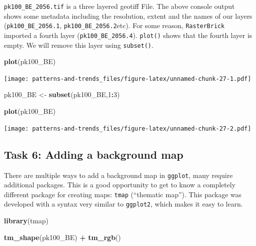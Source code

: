 \documentclass[]{book}
\newenvironment{Shaded}{\begin{snugshade}}{\end{snugshade}}
\newcommand{\DecValTok}[1]{\textcolor[rgb]{0.00,0.00,0.81}{#1}}
\newcommand{\KeywordTok}[1]{\textcolor[rgb]{0.13,0.29,0.53}{\textbf{#1}}}
\newcommand{\NormalTok}[1]{#1}
\newcommand{\OperatorTok}[1]{\textcolor[rgb]{0.81,0.36,0.00}{\textbf{#1}}}
\newcommand{\StringTok}[1]{\textcolor[rgb]{0.31,0.60,0.02}{#1}}
\begin{document}
\texttt{pk100\_BE\_2056.tif} is a three layered geotiff File. The above console output shows some metadata including the resolution, extent and the names of our layers (\texttt{pk100\_BE\_2056.1}, \texttt{pk100\_BE\_2056.2}etc). For some reason, \texttt{RasterBrick} imported a fourth layer (\texttt{pk100\_BE\_2056.4}). \texttt{plot()} shows that the fourth layer is empty. We will remove this layer using \texttt{subset()}.

\begin{Shaded}
\begin{Highlighting}[]

\KeywordTok{plot}\NormalTok{(pk100_BE)}
\end{Highlighting}
\end{Shaded}

\texttt{[image: patterns-and-trends\_files/figure-latex/unnamed-chunk-27-1.pdf]}

\begin{Shaded}
\begin{Highlighting}[]

\NormalTok{pk100_BE <-}\StringTok{ }\KeywordTok{subset}\NormalTok{(pk100_BE,}\DecValTok{1}\OperatorTok{:}\DecValTok{3}\NormalTok{)}

\KeywordTok{plot}\NormalTok{(pk100_BE)}
\end{Highlighting}
\end{Shaded}

\texttt{[image: patterns-and-trends\_files/figure-latex/unnamed-chunk-27-2.pdf]}

\hypertarget{task-6-adding-a-background-map}{%
\subsection{Task 6: Adding a background map}\label{task-6-adding-a-background-map}}

There are multiple ways to add a background map in \texttt{ggplot}, many require additional packages. This is a good opportunity to get to know a completely different package for creating maps: \texttt{tmap} (``thematic map''). This package was developed with a syntax very similar to \texttt{ggplot2}, which makes it easy to learn.

\begin{Shaded}
\begin{Highlighting}[]
\KeywordTok{library}\NormalTok{(tmap)}


\KeywordTok{tm_shape}\NormalTok{(pk100_BE) }\OperatorTok{+}\StringTok{ }
\StringTok{  }\KeywordTok{tm_rgb}\NormalTok{() }
\end{Highlighting}
\end{Shaded}
\end{document}
